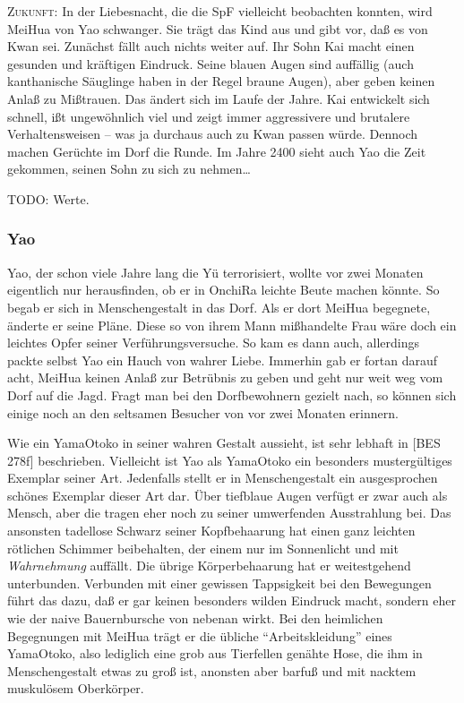 \documentclass[
a4paper,
twoside,
DIV=calc,
BCOR=4mm,
fontsize=9pt,
twocolumn=on,
titlepage=on,
parskip=half
]{scrartcl}
\begin{document}
\textsc{Zukunft:} In der Liebesnacht, die die SpF vielleicht
beobachten konnten, wird MeiHua von Yao schwanger. Sie trägt das Kind
aus und gibt vor, daß es von Kwan sei. Zunächst fällt auch nichts
weiter auf. Ihr Sohn Kai macht einen gesunden und kräftigen
Eindruck. Seine blauen Augen sind auffällig (auch kanthanische
Säuglinge haben in der Regel braune Augen), aber geben keinen Anlaß zu
Mißtrauen. Das ändert sich im Laufe der Jahre. Kai entwickelt sich
schnell, ißt ungewöhnlich viel und zeigt immer aggressivere und
brutalere Verhaltensweisen -- was ja durchaus auch zu Kwan passen
würde. Dennoch machen Gerüchte im Dorf die Runde. Im Jahre 2400 sieht
auch Yao die Zeit gekommen, seinen Sohn zu sich zu nehmen\dots

TODO: Werte.

\subsubsection{Yao}
\label{yao}

Yao, der schon viele Jahre lang die Yü terrorisiert, wollte vor zwei
Monaten eigentlich nur herausfinden, ob er in OnchiRa leichte Beute
machen könnte. So begab er sich in Menschengestalt in das Dorf. Als er
dort MeiHua begegnete, änderte er seine Pläne. Diese so von ihrem Mann
mißhandelte Frau wäre doch ein leichtes Opfer seiner
Verführungsversuche. So kam es dann auch, allerdings packte selbst Yao
ein Hauch von wahrer Liebe. Immerhin gab er fortan darauf acht, MeiHua
keinen Anlaß zur Betrübnis zu geben und geht nur weit weg vom Dorf auf
die Jagd. Fragt man bei den Dorfbewohnern gezielt nach, so können sich
einige noch an den seltsamen Besucher von vor zwei Monaten erinnern.

Wie ein YamaOtoko in seiner wahren Gestalt aussieht, ist sehr lebhaft
in [BES\,278f] beschrieben. Vielleicht ist Yao als YamaOtoko ein
besonders mustergültiges Exemplar seiner Art. Jedenfalls stellt er in
Menschengestalt ein ausgesprochen schönes Exemplar dieser Art
dar. Über tiefblaue Augen verfügt er zwar auch als Mensch, aber die
tragen eher noch zu seiner umwerfenden Ausstrahlung bei. Das ansonsten
tadellose Schwarz seiner Kopfbehaarung hat einen ganz leichten
rötlichen Schimmer beibehalten, der einem nur im Sonnenlicht und mit
\emph{Wahrnehmung} auffällt. Die übrige Körperbehaarung hat er
weitestgehend unterbunden. Verbunden mit einer gewissen Tappsigkeit
bei den Bewegungen führt das dazu, daß er gar keinen besonders wilden
Eindruck macht, sondern eher wie der naive Bauernbursche von nebenan
wirkt. Bei den heimlichen Begegnungen mit MeiHua trägt er die übliche
"`Arbeitskleidung"' eines YamaOtoko, also lediglich eine grob aus
Tierfellen genähte Hose, die ihm in Menschengestalt etwas zu groß ist,
anonsten aber barfuß und mit nacktem muskulösem Oberkörper.
\end{document}

